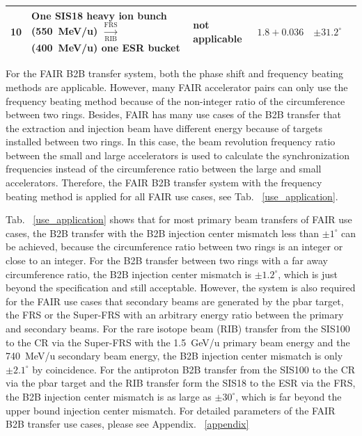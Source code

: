 \begin{table}
\begin{center}
\begin{tabular}{| c | p{4cm}| p{1.5cm} | c | p{2.3cm} |p{6cm} |}
10&One SIS18 heavy ion bunch (\SI{550}{MeV/u}) $\xrightarrow[\text{RIB}]{\text{FRS}}$ (\SI{400}{MeV/u}) one ESR bucket & not applicable &$1.8+0.036$&	$\pm31.2^\circ$	&\\ \hline

    \end{tabular}
\end{center}
\end{table}

For the FAIR B2B transfer system, both the phase shift and frequency beating methods are applicable. However, many FAIR accelerator pairs can only use the frequency beating method because of the non-integer ratio of the circumference between two rings. Besides, FAIR has many use cases of the B2B transfer that the extraction and injection beam have different energy because of targets installed between two rings. In this case, the beam revolution frequency ratio between the small and large accelerators is used to calculate the synchronization frequencies instead of the circumference ratio between the large and small accelerators. Therefore, the FAIR B2B transfer system with the frequency beating method is applied for all FAIR use cases, see Tab. ~\ref{use_application}.

Tab. ~\ref{use_application} shows that for most primary beam transfers of FAIR use cases, the B2B transfer with the B2B injection center mismatch less than $\pm1^\circ$ can be achieved, because the circumference ratio between two rings is an integer or close to an integer. For the B2B transfer between two rings with a far away circumference ratio, the B2B injection center mismatch is $\pm1.2^\circ$, which is just beyond the specification and still acceptable. However, the system is also required for the FAIR use cases that secondary beams are generated by the pbar target, the FRS or the Super-FRS with an arbitrary energy ratio between the primary and secondary beams. For the rare isotope beam (RIB) transfer from the SIS100 to the CR via the Super-FRS with the \SI{1.5}{GeV/u} primary beam energy and the \SI{740}{MeV/u} secondary beam energy, the B2B injection center mismatch is only $\pm2.1^\circ$ by coincidence. For the antiproton B2B transfer from the SIS100 to the CR via the pbar target and the RIB transfer form the SIS18 to the ESR via the FRS, the B2B injection center mismatch is as large as $\pm30^\circ$, which is far beyond the upper bound injection center mismatch. For detailed parameters of the FAIR B2B transfer use cases, please see Appendix. ~\ref{appendix}


